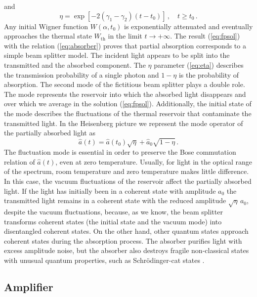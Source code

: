 \documentclass[12pt,amsmath,amssymb]{article}
\numberwithin{equation}{section}
\begin{document}
and
\begin{equation}
\label{eq:eta} \eta = \exp\left[-2(\gamma_1-\gamma_2)(t-t_0)
\right] \,,\quad t \ge t_0 \,.
\end{equation}
Any initial Wigner function $W(\alpha,t_0)$ is exponentially
attenuated and eventually approaches the thermal state
$W_\mathrm{th}$ in the limit $t\rightarrow+\infty$.
The result (\ref{eq:fpsol}) with the relation (\ref{eq:absorber})
proves that partial absorption corresponds
to a simple beam splitter model. The incident light appears to be
split into the transmitted and the absorbed component. The $\eta$
parameter (\ref{eq:eta}) describes the transmission probability
of a single photon and $1-\eta$ is the probability of absorption.
The second mode of the fictitious beam splitter plays a double
role. The mode represents the reservoir into which the absorbed
light disappears and over which we average in the solution
(\ref{eq:fpsol}). Additionally, the initial state of the mode
describes the fluctuations of the thermal reservoir that
contaminate the transmitted light. In the Heisenberg picture we
represent the mode operator of the partially absorbed light as
\begin{equation}
\hat{a}(t) = \hat{a}(t_0) \sqrt{\eta} + \hat{a}_0 \sqrt{1-\eta}
\,.
\end{equation}
The fluctuation mode is essential in order to preserve the Bose
commutation relation of $\hat{a}(t)$, even at zero temperature.
Usually, for light in the optical range of the spectrum, room
temperature and zero temperature makes little difference. In this
case, the vacuum fluctuations of the reservoir affect the
partially absorbed light. If the light has initially
been in a coherent state with amplitude $a_0$ the transmitted
light remains in a coherent state with the reduced amplitude
$\sqrt{\eta}\,a_0$, despite the vacuum fluctuations,
because, as we know, the beam splitter
transforms coherent states (the initial state and the vacuum
mode) into disentangled coherent states. On the other hand, other
quantum states approach coherent states during the absorption
process. The absorber purifies light with excess amplitude noise,
but the absorber also destroys fragile non-classical states with
unusual quantum properties, such as Schr\"odinger-cat states
\cite{Brune,LeoSU2}.

\subsection{Amplifier}
\end{document}
